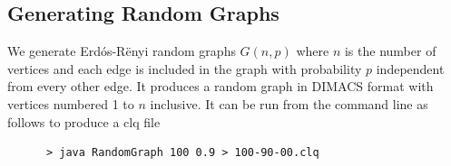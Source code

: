 \documentclass{l4proj}
\begin{document}
\begin{appendices}
\chapter{Generating Random Graphs}
\label{sec:randomGraph}
We generate Erd\'{o}s-R\"{e}nyi random graphs $G(n,p)$ where $n$ is the number of vertices and
each edge is included in the graph with probability $p$ independent from every other edge. It produces
a random graph in DIMACS format with vertices numbered 1 to $n$ inclusive. It can be run from the command line as follows to produce 
a clq file
\begin{verbatim}
      > java RandomGraph 100 0.9 > 100-90-00.clq
\end{verbatim}
\end{appendices}




\end{document}
